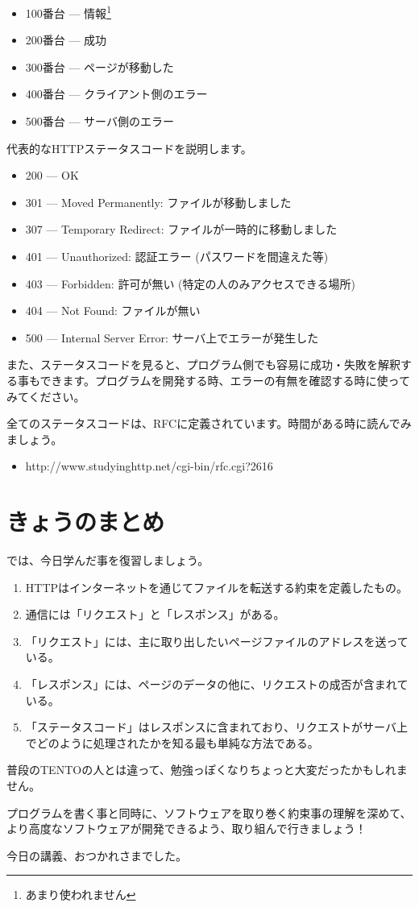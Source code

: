 \documentclass[a4j,11pt,openany]{jsbook}
\begin{document}
\begin{itemize}
    \item 100番台 --- 情報\footnote{あまり使われません}
    \item 200番台 --- 成功
    \item 300番台 --- ページが移動した
    \item 400番台 --- クライアント側のエラー
    \item 500番台 --- サーバ側のエラー
\end{itemize}

代表的なHTTPステータスコードを説明します。

\begin{itemize}
    \item 200 --- OK
    \item 301 --- Moved Permanently: ファイルが移動しました
    \item 307 --- Temporary Redirect: ファイルが一時的に移動しました
    \item 401 --- Unauthorized: 認証エラー (パスワードを間違えた等)
    \item 403 --- Forbidden: 許可が無い (特定の人のみアクセスできる場所)
    \item 404 --- Not Found: ファイルが無い
    \item 500 --- Internal Server Error: サーバ上でエラーが発生した
\end{itemize}

また、ステータスコードを見ると、プログラム側でも容易に成功・失敗を解釈する事もできます。プログラムを開発する時、エラーの有無を確認する時に使ってみてください。

全てのステータスコードは、RFCに定義されています。時間がある時に読んでみましょう。

\begin{itemize}
    \item http://www.studyinghttp.net/cgi-bin/rfc.cgi?2616
\end{itemize}

\chapter{きょうのまとめ}

では、今日学んだ事を復習しましょう。

\begin{enumerate}
    \item HTTPはインターネットを通じてファイルを転送する約束を定義したもの。
    \item 通信には「リクエスト」と「レスポンス」がある。
    \item 「リクエスト」には、主に取り出したいページファイルのアドレスを送っている。
    \item 「レスポンス」には、ページのデータの他に、リクエストの成否が含まれている。
    \item 「ステータスコード」はレスポンスに含まれており、リクエストがサーバ上でどのように処理されたかを知る最も単純な方法である。
\end{enumerate}

普段のTENTOの人とは違って、勉強っぽくなりちょっと大変だったかもしれません。

プログラムを書く事と同時に、ソフトウェアを取り巻く約束事の理解を深めて、より高度なソフトウェアが開発できるよう、取り組んで行きましょう！

今日の講義、おつかれさまでした。




\end{document}
